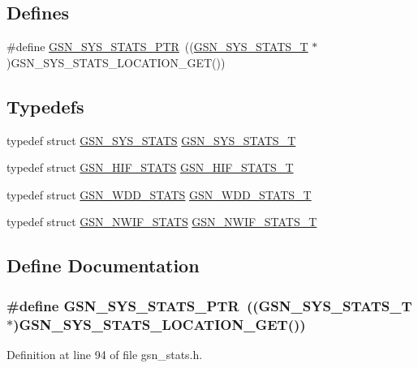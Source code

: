 \subsection*{Defines}
\begin{DoxyCompactItemize}
\item 
\#define \hyperlink{a00591_aded3a350c1044994a4908b375bf6d8a2}{GSN\_\-SYS\_\-STATS\_\-PTR}~((\hyperlink{a00260}{GSN\_\-SYS\_\-STATS\_\-T} $\ast$)GSN\_\-SYS\_\-STATS\_\-LOCATION\_\-GET())
\end{DoxyCompactItemize}
\subsection*{Typedefs}
\begin{DoxyCompactItemize}
\item 
typedef struct \hyperlink{a00260}{GSN\_\-SYS\_\-STATS} \hyperlink{a00591_ad30597595cc19608186140676d0969ed}{GSN\_\-SYS\_\-STATS\_\-T}
\item 
typedef struct \hyperlink{a00092}{GSN\_\-HIF\_\-STATS} \hyperlink{a00591_a5a7bc0d65205484eed0106fa5ca4fdf5}{GSN\_\-HIF\_\-STATS\_\-T}
\item 
typedef struct \hyperlink{a00301}{GSN\_\-WDD\_\-STATS} \hyperlink{a00591_a8d6b9fca3d17acbf280aa9c7df404600}{GSN\_\-WDD\_\-STATS\_\-T}
\item 
typedef struct \hyperlink{a00176}{GSN\_\-NWIF\_\-STATS} \hyperlink{a00591_a69ff6afd3f28a43690172bb64675e2ae}{GSN\_\-NWIF\_\-STATS\_\-T}
\end{DoxyCompactItemize}


\subsection{Define Documentation}
\hypertarget{a00591_aded3a350c1044994a4908b375bf6d8a2}{
\subsubsection[{GSN\_\-SYS\_\-STATS\_\-PTR}]{\setlength{\rightskip}{0pt plus 5cm}\#define GSN\_\-SYS\_\-STATS\_\-PTR~(({\bf GSN\_\-SYS\_\-STATS\_\-T} $\ast$)GSN\_\-SYS\_\-STATS\_\-LOCATION\_\-GET())}}
\label{a00591_aded3a350c1044994a4908b375bf6d8a2}


Definition at line 94 of file gsn\_\-stats.h.



